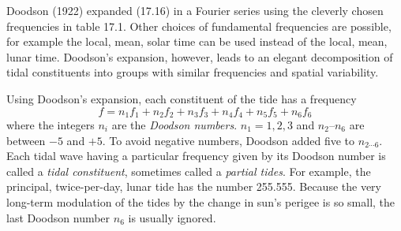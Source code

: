Doodson (1922) expanded (17.16) in a Fourier series using the cleverly
chosen frequencies in table 17.1. Other choices of fundamental
frequencies are possible, for example the local, mean, solar time can
be used instead of the local, mean, lunar time. Doodson's expansion,
however, leads to an elegant decomposition of tidal constituents into
groups with similar frequencies and spatial variability.

Using Doodson's expansion, each constituent of the tide has a
frequency
\begin{equation}
f = n_1 f_1 + n_2 f_2 + n_3 f_3 + n_4 f_4 + n_5 f_5 + n_6 f_6
\end{equation}
where the integers $n_i$ are the \textit{Doodson
  numbers}. $n_1 = 1, 2, 3 $ and $n_2$--$n_6$ are between $-5$
and $+5$. To avoid negative numbers, Doodson added five to $n_{2
  \cdots 6}$. Each tidal wave having a particular frequency given by
its Doodson number is called a \textit{tidal
  constituent}, sometimes called a
\textit{partial tides}. For example, the
principal, twice-per-day, lunar tide has the number 255.555. Because
the very long-term modulation of the tides by the change in sun's
perigee is so small, the last Doodson number $n_6$ is usually ignored.

